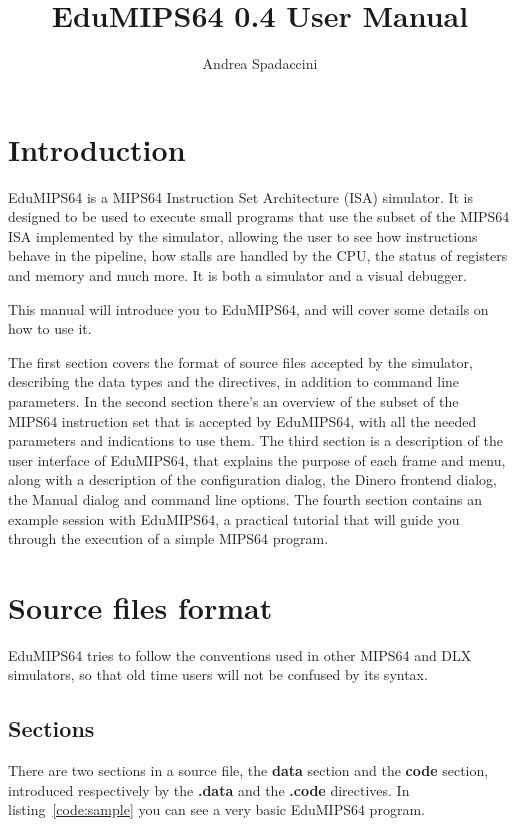 \documentclass[12pt]{report}
\author{Andrea Spadaccini}
\title{EduMIPS64 0.4 User Manual}
\newcommand{\EM}{EduMIPS64}
\newcommand{\MS}{MIPS64}
\begin{document}
\setlength{\baselineskip}{1.60\baselineskip} %
\maketitle
\chapter{Introduction}
\EM{} is a \MS{} Instruction Set Architecture (ISA) simulator. It is designed to
be used to execute small programs that use the subset of the \MS{} ISA
implemented by the simulator, allowing the user to see how instructions behave
in the pipeline, how stalls are handled by the CPU, the status of registers and
memory and much more. It is both a simulator and a visual debugger.

This manual will introduce you to \EM{}, and will cover some details on how to
use it.

The first section covers the format of source files accepted by the simulator,
describing the data types and the directives, in addition to command line
parameters. In the second section there's an overview of the subset of the \MS{}
instruction set that is accepted by \EM{}, with all the needed parameters and
indications to use them. The third section is a description of the user
interface of \EM{}, that explains the purpose of each frame and menu, along with a
description of the configuration dialog, the Dinero frontend dialog, the Manual
dialog and command line options. The fourth section contains an example session
with \EM{}, a practical tutorial that will guide you through the execution of a
simple \MS{} program.

\chapter{Source files format}
\EM{} tries to follow the conventions used in other \MS{} and DLX simulators, so
that old time users will not be confused by its syntax.

\section{Sections}
There are two sections in a source file, the \textbf{data} section and the
\textbf{code} section, introduced respectively by the \textbf{.data} and the
\textbf{.code} directives. In listing~\ref{code:sample} you can see a very basic
\EM{} program.
\end{document}
